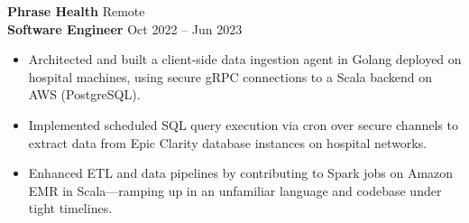 \documentclass[11pt,letterpaper]{article}
\begin{document}
                                                                \textbf{\large Phrase Health} \hfill Remote \\
                                                                \textbf{Software Engineer} \hfill Oct 2022 -- Jun 2023
                                                                \begin{itemize}
                                                                    \item Architected and built a client-side data ingestion agent in Golang deployed on hospital machines, using secure gRPC connections to a Scala backend on AWS (PostgreSQL).
                                                                        \item Implemented scheduled SQL query execution via cron over secure channels to extract data from Epic Clarity database instances on hospital networks.
                                                                            \item Enhanced ETL and data pipelines by contributing to Spark jobs on Amazon EMR in Scala---ramping up in an unfamiliar language and codebase under tight timelines.
                                                                            \end{itemize}

                                                                            \vspace{6pt}
\end{document}
